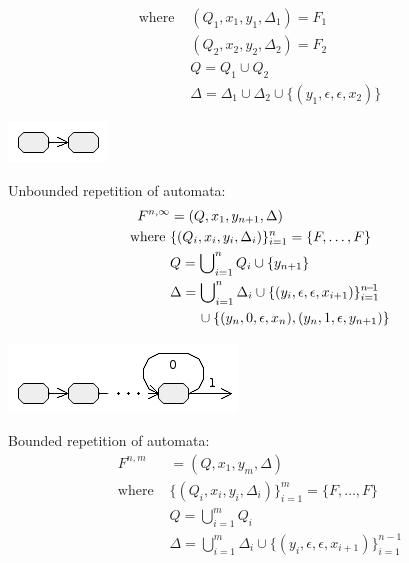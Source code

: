 \documentclass{article}
\theoremstyle{definition}
\begin{document}
\begin{multicols}{2}
\begin{align*}
        \text{where }
            & (Q_1, x_1, y_1, \Delta_1) = F_1 \\
            & (Q_2, x_2, y_2, \Delta_2) = F_2 \\
            & Q = Q_1 \cup Q_2  \\
            & \Delta = \Delta_1 \cup \Delta_2 \cup \{ (y_1, \epsilon, \epsilon, x_2) \}
    \end{align*}
%
\begin{center}
\includegraphics[width=0.25\linewidth]{img/tnfa/concat.png}
\end{center}
%
Unbounded repetition of automata:
    \begin{align*}
        F^{n,\infty} &= (Q, x_1, y_{n+1}, \Delta) \\
        \text{where }
            & \{(Q_i, x_i, y_i, \Delta_i)\}_{i=1}^n = \{F, \dots, F\} \\
            & Q = \bigcup\nolimits_{i=1}^n Q_i \cup \{ y_{n+1} \} \\
            & \Delta = \bigcup\nolimits_{i=1}^n \Delta_i
                \cup \{(y_i, \epsilon, \epsilon, x_{i+1})\}_{i=1}^{n\!-\!1} \\
                & \hphantom{\hspace{2em}}
                    \cup \{ (y_n, 0, \epsilon, x_n), (y_n, 1, \epsilon, y_{n+1}) \}
    \end{align*}
%
\begin{center}
\includegraphics[width=0.55\linewidth]{img/tnfa/repeat_unbound.png}
\end{center}
%
Bounded repetition of automata:
    \begin{align*}
        F^{n,m} &= (Q, x_1, y_m, \Delta) \\
        \text{where }
            & \{(Q_i, x_i, y_i, \Delta_i)\}_{i=1}^m = \{F, \dots, F\} \\
            & Q = \bigcup\nolimits_{i=1}^m Q_i \\
            & \Delta = \bigcup\nolimits_{i=1}^m \Delta_i
                \cup \{(y_i, \epsilon, \epsilon, x_{i+1})\}_{i=1}^{n\!-\!1} \\

\end{align*}
\end{multicols}
\end{document}
